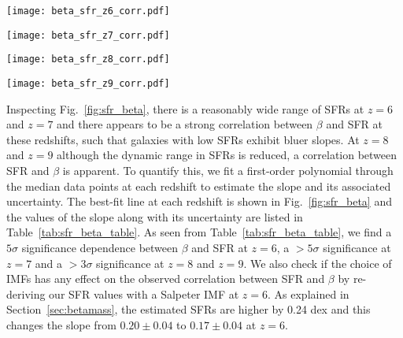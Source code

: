 \documentclass[twocolumn]{aastex63}
\begin{document}
\begin{figure*}
\centering
\begin{minipage}{0.45\textwidth}
\centering
\texttt{[image: beta\_sfr\_z6\_corr.pdf]}
\end{minipage}
\begin{minipage}{0.45\textwidth}
\centering
\texttt{[image: beta\_sfr\_z7\_corr.pdf]}
\end{minipage}
\begin{minipage}{0.45\textwidth}
\centering
\texttt{[image: beta\_sfr\_z8\_corr.pdf]}
\end{minipage}
\begin{minipage}{0.45\textwidth}
\centering
\texttt{[image: beta\_sfr\_z9\_corr.pdf]}
\end{minipage}
\caption{Measured UV slope $\beta$ vs SFR at $z=6-9$. The filled yellow circles show the results for individual galaxies, whereas the black circles show the median value of $\beta$ in each SFR bin of $1\mathrm{M_{\odot}yr^{-1}}$. The vertical error bars denote the errors on the median estimated with bootstrap Monte Carlo simulations whereas the horizontal error bars represent the width of the bins. The solid red lines show a linear fit through the median $\beta$ points. There is a strong correlation between $\beta$ and SFR, such that galaxies with low SFRs exhibit bluer slopes. The best-fit line at $z=6$ is copied on other redshifts as a reference point, shown by dashed blue line.}
\label{fig:sfr_beta}
\end{figure*}

Inspecting Fig.~\ref{fig:sfr_beta}, there is a reasonably wide range of SFRs at $z=6$ and $z=7$ and there appears to be a strong correlation between $\beta$ and SFR at these redshifts, such that galaxies with low SFRs exhibit bluer slopes. At $z=8$ and $z=9$ although the dynamic range in SFRs is reduced, a correlation between SFR and $\beta$ is apparent. To quantify this, we fit a first-order polynomial through the median data points at each redshift to estimate the slope and its associated uncertainty. The best-fit line at each redshift is shown in Fig.~\ref{fig:sfr_beta} and the values of the slope along with its uncertainty are listed in Table~\ref{tab:sfr_beta_table}. As seen from Table~\ref{tab:sfr_beta_table}, we find a $5\sigma$ significance dependence between $\beta$ and SFR at $z=6$, a $>5\sigma$ significance at $z=7$ and a $>3\sigma$ significance at $z=8$ and $z=9$. We also check if the choice of IMFs has any effect on the observed correlation between SFR and $\beta$ by re-deriving our SFR values with a Salpeter IMF at $z=6$. As explained in Section~\ref{sec:betamass}, the estimated SFRs are higher by 0.24 dex and this changes the slope from $0.20\pm0.04$ to $0.17\pm0.04$ at $z=6$.
\end{document}
